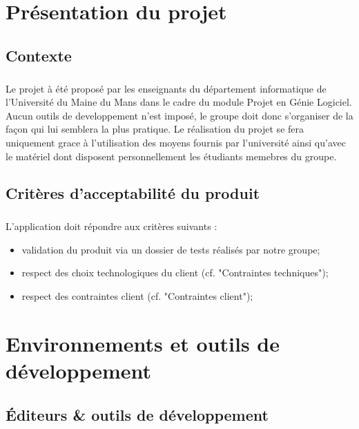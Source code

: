 \chapter{Présentation du projet}
\section{Contexte}
        \paragraph*{}
	Le projet à été proposé par les enseignants du département informatique de l'Université du Maine du Mans 
	dans le cadre du module Projet en Génie Logiciel.
	Aucun outils de developpement n'est imposé, le groupe doit donc s'organiser de la façon qui lui semblera la plus pratique. 
	Le réalisation du projet se fera uniquement grace à l'utilisation des moyens fournis par l'université ainsi qu'avec le matériel dont 
	disposent personnellement les étudiants memebres du groupe. 


\section{Critères d'acceptabilité du produit}
        \paragraph*{}
	L’application doit répondre aux critères suivants :
	\begin{itemize}
  	  	\item validation du produit via un dossier de tests réalisés par notre groupe;
  	  	\item respect des choix technologiques du client (cf. "Contraintes techniques");
  	  	\item respect des contraintes client (cf. "Contraintes client");
	\end{itemize}



\chapter{Environnements et outils de développement} 


\section{Éditeurs \& outils de développement}
